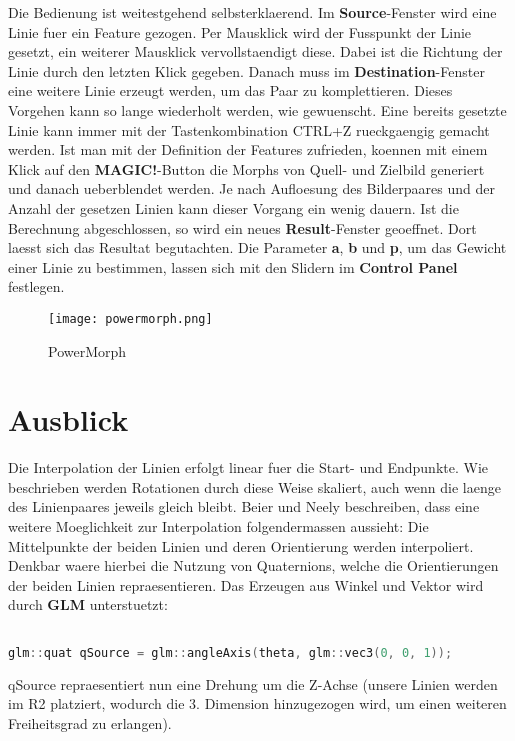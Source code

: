 Die Bedienung ist weitestgehend selbsterklaerend. Im \textbf{Source}-Fenster wird eine Linie fuer ein Feature gezogen. Per
Mausklick wird der Fusspunkt der Linie gesetzt, ein weiterer
Mausklick vervollstaendigt diese. Dabei ist die Richtung der Linie
durch den letzten Klick gegeben. Danach muss
im \textbf{Destination}-Fenster eine weitere Linie erzeugt werden, um das
Paar zu komplettieren. Dieses Vorgehen kann so lange wiederholt
werden, wie gewuenscht. Eine bereits gesetzte Linie kann immer mit
der Tastenkombination CTRL+Z rueckgaengig gemacht werden.
Ist man mit der Definition der Features zufrieden, koennen mit einem
Klick auf den \textbf{MAGIC!}-Button die Morphs von Quell- und Zielbild
generiert und danach ueberblendet werden. Je nach Aufloesung des Bilderpaares
und der Anzahl der gesetzen Linien kann dieser Vorgang ein wenig
dauern. Ist die Berechnung abgeschlossen, so wird ein
neues \textbf{Result}-Fenster geoeffnet. Dort laesst sich das
Resultat begutachten. Die Parameter \textbf{a}, \textbf{b} und
\textbf{p}, um das Gewicht einer Linie zu bestimmen, lassen
sich mit den Slidern im \textbf{Control Panel} festlegen.

\begin{figure}[htb]
	\centering
	\texttt{[image: powermorph.png]}
	\caption{PowerMorph}
	\label{fig:powermorph}
\end{figure}

\section{Ausblick}

Die Interpolation der Linien erfolgt linear fuer die Start-
und Endpunkte. Wie beschrieben werden Rotationen durch
diese Weise skaliert, auch wenn die laenge des Linienpaares
jeweils gleich bleibt. Beier und Neely beschreiben,
dass eine weitere Moeglichkeit zur Interpolation folgendermassen
aussieht:
Die Mittelpunkte der beiden Linien und deren Orientierung
werden interpoliert. Denkbar waere hierbei die Nutzung
von Quaternions, welche die Orientierungen der beiden
Linien repraesentieren. Das Erzeugen aus Winkel
und Vektor wird durch \textbf{GLM} unterstuetzt:

\begin{lstlisting}[language=C++, caption=Quaternions in GLM, label=quaternion, xleftmargin=0.5cm]

glm::quat qSource = glm::angleAxis(theta, glm::vec3(0, 0, 1));
\end{lstlisting}
qSource repraesentiert nun eine Drehung um die Z-Achse
(unsere Linien werden im R2 platziert, wodurch die
3. Dimension hinzugezogen wird, um einen weiteren
Freiheitsgrad zu erlangen).

